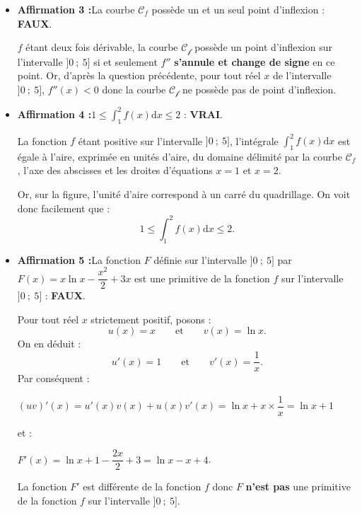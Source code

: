 \begin{corrige}
\begin{itemize}
          \item %
          \textbf{Affirmation 3 :}\quad La courbe $\mathscr{C}_f$ possède un et un seul point d'inflexion : \textbf{FAUX}.
          \par
          $f$ étant deux fois dérivable, la courbe $\mathscr{C_f}$ possède un point d'inflexion sur l'intervalle $]0~;~5]$ si et seulement $f''$ \textbf{s'annule et change de signe} en ce point. Or, d'après la question précédente, pour tout réel $x$ de l'intervalle $]0~;~5]$, $f''(x)<0$ donc la courbe $\mathscr{C_f}$ ne possède pas de point d'inflexion.
          \item %
          \textbf{Affirmation 4 :}\quad $1 \leqslant \displaystyle\int_{1}^{2}f(x)\text{d}x \leqslant 2$ : \textbf{VRAI}.
          \par
          La fonction $f$ étant positive sur l'intervalle $]0~;~5]$, l'intégrale $\displaystyle\int_{1}^{2}f(x)\text{d}x$ est égale à l'aire, exprimée en unités d'aire, du domaine délimité par la courbe $\mathscr{C}_f$, l'axe des abscisses et les droites d'équations $x=1$ et $x=2$.
          \par
          Or, sur la figure, l'unité d'aire correspond à un carré du quadrillage. On voit donc facilement que :
          \[ 1 \leqslant \displaystyle\int_{1}^{2}f(x)\text{d}x \leqslant 2. \]
          \item %
          \textbf{Affirmation 5 :}\quad La fonction $F$ définie sur l'intervalle $]0~;~5]$ par $F(x) =  x\ln x - \dfrac{x^2}{2} + 3x $ est une primitive de la fonction $f$ sur l'intervalle $]0~;~5]$ : \textbf{FAUX}.
          \par
          Pour tout réel $x$ strictement positif, posons :
          \[ u(x)=x \qquad \text{et} \qquad v(x)=\ln x. \]
          On en déduit :
          \[ u'(x)=1 \qquad \text{et} \qquad  v'(x)=\dfrac{1}{x}.\]
          Par conséquent :
          \par
          $(uv)'(x)=u'(x)v(x)+u(x)v'(x)=\ln x+x \times \dfrac{1}{x}=\ln x + 1$
          \par
          et :
          \par
          $F'(x)=\ln x + 1 - \dfrac{2x}{2} + 3 = \ln x - x + 4$.
          \par
          La fonction $F'$ est différente de la fonction $f$ donc $F$ \textbf{n'est pas} une primitive de la fonction $f$ sur l'intervalle $]0~;~5]$.
          \par
     \end{itemize}
\end{corrige}
